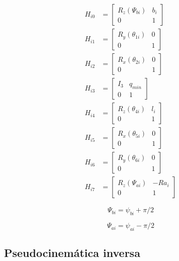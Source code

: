 \begin{subequations}
 \begin{align}
  H_{i0} & = \begin{bmatrix}
R_z(\Psi_{bi}) & b_i\\
0 & 1
\end{bmatrix} \\
H_{i1} & = \begin{bmatrix}
R_y(\theta_{1i}) & 0\\
0 & 1
\end{bmatrix} \\
H_{i2} & = \begin{bmatrix}
R_x(\theta_{2i}) & 0\\
0 & 1
\end{bmatrix} \\
H_{i3} & = \begin{bmatrix}
I_3 & q_{min}\\
0 & 1
\end{bmatrix}\\
H_{i4} & = \begin{bmatrix}
R_z(\theta_{4i}) & l_i\\
0 & 1
\end{bmatrix} \\
H_{i5} & = \begin{bmatrix}
R_x(\theta_{5i}) & 0\\
0 & 1
\end{bmatrix} \\
H_{i6} & = \begin{bmatrix}
R_y(\theta_{6i}) & 0\\
0 & 1
\end{bmatrix} \\
H_{i7} & = \begin{bmatrix}
R_z(\Psi_{ai}) & -Ra_i\\
0 & 1
\end{bmatrix}
 \end{align}
\end{subequations}

\begin{equation}
 \Psi_{bi}  = \psi_{bi} + \pi/2
\end{equation}

\begin{equation}
 \Psi_{ai}  = \psi_{ai} - \pi/2
\end{equation}

\subsection{Pseudocinemática inversa}

